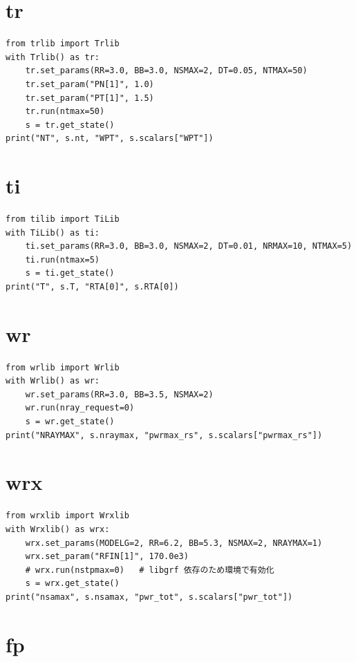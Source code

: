 \documentclass[11pt,a4paper]{report}
\begin{document}
\section{tr}

\begin{lstlisting}[style=py]
from trlib import Trlib
with Trlib() as tr:
    tr.set_params(RR=3.0, BB=3.0, NSMAX=2, DT=0.05, NTMAX=50)
    tr.set_param("PN[1]", 1.0)
    tr.set_param("PT[1]", 1.5)
    tr.run(ntmax=50)
    s = tr.get_state()
print("NT", s.nt, "WPT", s.scalars["WPT"])
\end{lstlisting}

\section{ti}

\begin{lstlisting}[style=py]
from tilib import TiLib
with TiLib() as ti:
    ti.set_params(RR=3.0, BB=3.0, NSMAX=2, DT=0.01, NRMAX=10, NTMAX=5)
    ti.run(ntmax=5)
    s = ti.get_state()
print("T", s.T, "RTA[0]", s.RTA[0])
\end{lstlisting}

\section{wr}

\begin{lstlisting}[style=py]
from wrlib import Wrlib
with Wrlib() as wr:
    wr.set_params(RR=3.0, BB=3.5, NSMAX=2)
    wr.run(nray_request=0)
    s = wr.get_state()
print("NRAYMAX", s.nraymax, "pwrmax_rs", s.scalars["pwrmax_rs"])
\end{lstlisting}

\section{wrx}

\begin{lstlisting}[style=py]
from wrxlib import Wrxlib
with Wrxlib() as wrx:
    wrx.set_params(MODELG=2, RR=6.2, BB=5.3, NSMAX=2, NRAYMAX=1)
    wrx.set_param("RFIN[1]", 170.0e3)
    # wrx.run(nstpmax=0)   # libgrf 依存のため環境で有効化
    s = wrx.get_state()
print("nsamax", s.nsamax, "pwr_tot", s.scalars["pwr_tot"])
\end{lstlisting}

\section{fp}
\end{document}
